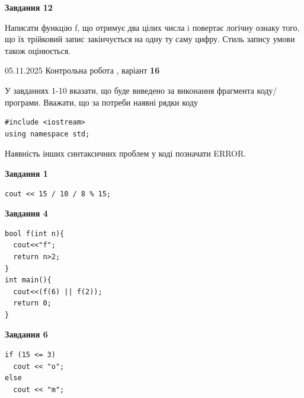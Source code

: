 \documentclass[12pt, ukrainian]{article}
\begin{document}
{\begin {large}
\begin{minipage}[t]{11.0cm}
\begin{center}
\textbf{Завдання 12}
\end{center}

Написати функцiю f, що отримує два цілих числа i повертає логічну ознаку того, що їх трійковий запис закінчується на одну ту саму цифру. Стиль запису умови також оцінюється.\par

\end{minipage}

\end {large}}
\newpage

{\Large{05.11.2025 Контрольна робота , варіант  \No \textbf { 16 }\par}}
{
\begin {large}
У завданнях 1-10 вказати, що буде виведено за виконання фрагмента коду/про\-гра\-ми.
Вважати, що за потреби наявні рядки коду
\begin{verbatim}
#include <iostream>
using namespace std;
\end{verbatim}
Наявність інших синтаксичних проблем у коді позначати ERROR.

\begin{minipage}[t]{7.0cm}

\begin{center}
\textbf{Завдання 1}
\end{center}
\vspace{-8mm}

\begin{verbatim}
cout << 15 / 10 / 8 % 15;
\end{verbatim}



\begin{center}
\textbf{Завдання 4}
\end{center}
\vspace{-8mm}

\begin{verbatim}
bool f(int n){
  cout<<"f";
  return n>2;
}
int main(){
  cout<<(f(6) || f(2));
  return 0;
}
\end{verbatim}



\begin{center}
\textbf{Завдання 6}
\end{center}
\vspace{-8mm}

\begin{verbatim}
if (15 <= 3)
  cout << "o";
else
  cout << "m";
\end{verbatim}




\end{minipage}
\end{large}}
\end{document}

